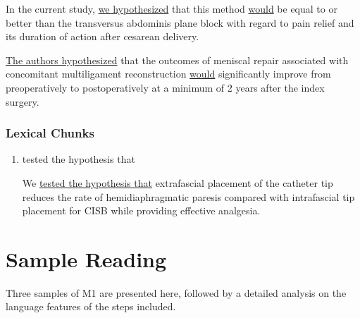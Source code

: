 \documentclass{ctexbook}
\begin{document}
    \begin{eg}{}
      In the current study, \uline{we hypothesized} that this method \uline{would} be equal to or better than the transversus abdominis plane block with regard to pain relief and its duration of action after cesarean delivery.
    \end{eg}

    \begin{eg}{}
      \uline{The authors hypothesized} that the outcomes of meniscal repair associated with concomitant multiligament reconstruction \uline{would} significantly improve from preoperatively to postoperatively at a minimum of 2 years after the index surgery.
    \end{eg}


    \subsubsection{Lexical Chunks}

    \begin{enumerate}
      \item tested the hypothesis that
      \begin{eg}
        We \uline{tested the hypothesis that} extrafascial placement of the catheter tip reduces the rate of hemidiaphragmatic paresis compared with intrafascial tip placement for CISB while providing effective analgesia.
      \end{eg}
    \end{enumerate}

\section{Sample Reading}

Three samples of M1 are presented here, followed by a detailed analysis on the language features of the steps included.
\end{document}
